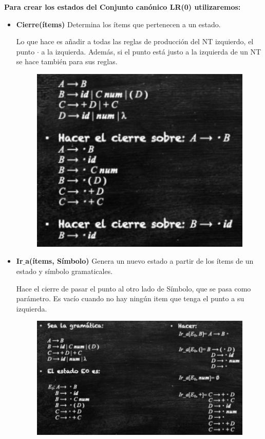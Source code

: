 \documentclass[12pt]{report} %
\begin{document}
\textbf{Para crear los estados del Conjunto canónico LR(0) utilizaremos:}
\begin{itemize}
  \item \textbf{Cierre(ítems)} Determina los ítems que pertenecen a un estado. 
  
  Lo que hace es añadir a todas las reglas de producción del NT izquierdo, el punto $\cdot$ a la izquierda. Además, si el punto está justo a la izquierda de un NT se hace también para sus reglas. 
  \begin{figure}[H]
    {\includegraphics[scale=.4]{2021-03-26 19_10_20-ASintactico.pdf - Foxit Reader.png}}
  \end{figure}
  
  \item \textbf{Ir$\_$a(ítems, Símbolo)} Genera un nuevo estado a partir de los ítems de un estado y símbolo gramaticales.
  
  Hace el cierre de pasar el punto al otro lado de Símbolo, que se pasa como parámetro. Es vacío cuando no hay ningún item que tenga el punto a su izquierda.
  \begin{figure}[H]
    {\includegraphics[scale=.4]{2021-03-26 19_14_19-ASintactico.pdf - Foxit Reader.png}}
  \end{figure}
\end{itemize}
\end{document}
